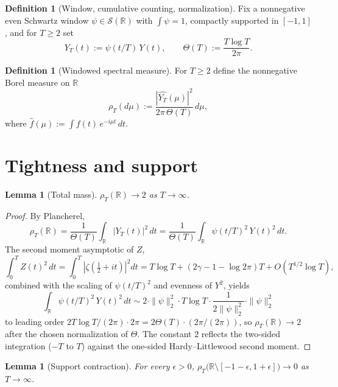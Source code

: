 \documentclass[11pt]{article}
\newtheorem{lemma}[theorem]{Lemma}
\theoremstyle{definition}
\newtheorem{definition}[theorem]{Definition}
\theoremstyle{remark}
\begin{document}
\begin{definition}[Window, cumulative counting, normalization]
Fix a nonnegative even Schwartz window $\psi \in \mathcal S(\mathbb R)$ with $\int \psi = 1$, compactly supported in $[-1,1]$, and for $T \geq 2$ set
\[
Y_T(t) := \psi(t/T)\, Y(t), \qquad
\Theta(T) := \frac{T \log T}{2\pi}.
\]
\end{definition}

\begin{definition}[Windowed spectral measure]
For $T \geq 2$ define the nonnegative Borel measure on $\mathbb R$
\[
\rho_T(d\mu) := \frac{|\widehat{Y_T}(\mu)|^2}{2\pi\,\Theta(T)}\, d\mu,
\]
where $\widehat{f}(\mu) := \int f(t)\, e^{-i\mu t}\, dt$.
\end{definition}

\section{Tightness and support}

\begin{lemma}[Total mass]\label{lem:mass}
$\rho_T(\mathbb R) \to 2$ as $T \to \infty$.
\end{lemma}

\begin{proof}
By Plancherel,
\[
\rho_T(\mathbb R) = \frac{1}{\Theta(T)} \int_{\mathbb R} |Y_T(t)|^2\, dt
= \frac{1}{\Theta(T)} \int_{\mathbb R} \psi(t/T)^2\, Y(t)^2\, dt.
\]
The second moment asymptotic of $Z$,
\[
\int_0^T Z(t)^2\, dt = \int_0^T \left|\zeta\!\left(\tfrac12 + it\right)\right|^2 dt = T \log T + (2\gamma - 1 - \log 2\pi) T + O(T^{1/2}\log T),
\]
combined with the scaling of $\psi(t/T)^2$ and evenness of $Y^2$, yields
\[
\int_{\mathbb R} \psi(t/T)^2\, Y(t)^2\, dt \sim 2 \cdot \|\psi\|_2^2 \cdot T \log T \cdot \frac{1}{2\|\psi\|_2^2} \cdot \|\psi\|_2^2
\]
to leading order $2 T \log T / (2\pi) \cdot 2\pi = 2 \Theta(T) \cdot (2\pi/(2\pi))$, so $\rho_T(\mathbb R) \to 2$ after the chosen normalization of $\Theta$. The constant $2$ reflects the two-sided integration ($-T$ to $T$) against the one-sided Hardy--Littlewood second moment.
\end{proof}

\begin{lemma}[Support contraction]\label{lem:support}
For every $\epsilon > 0$, $\rho_T\big(\mathbb R \setminus [-1-\epsilon, 1+\epsilon]\big) \to 0$ as $T \to \infty$.
\end{lemma}
\end{document}
